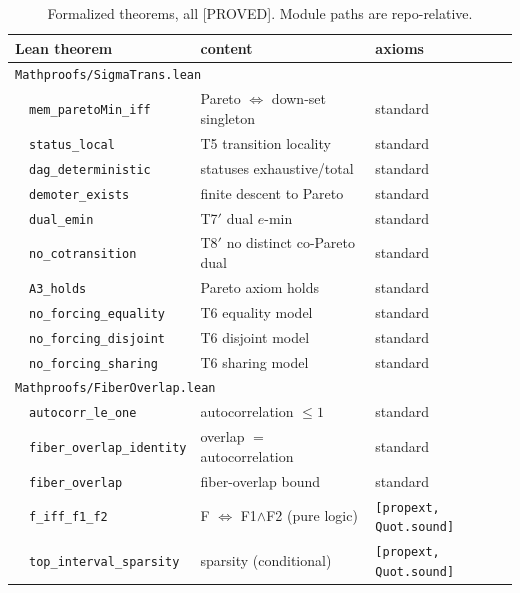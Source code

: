 \documentclass[11pt,a4paper]{article}
\theoremstyle{definition}
\begin{document}
\begin{table}[t]
  \centering
  \caption{Formalized theorems, all [PROVED]. Module paths are
    repo-relative.}
  \label{tab:formalization}
  \begin{tabular}{lll}
    \toprule
    Lean theorem & content & axioms \\
    \midrule
    \multicolumn{3}{l}{\texttt{Mathproofs/SigmaTrans.lean}} \\
    \ \ \texttt{mem\_paretoMin\_iff} & Pareto $\iff$ down-set singleton
      & standard \\
    \ \ \texttt{status\_local} & T5 transition locality & standard \\
    \ \ \texttt{dag\_deterministic} & statuses exhaustive/total & standard \\
    \ \ \texttt{demoter\_exists} & finite descent to Pareto & standard \\
    \ \ \texttt{dual\_emin} & T7$'$ dual $e$-min & standard \\
    \ \ \texttt{no\_cotransition} & T8$'$ no distinct co-Pareto dual
      & standard \\
    \ \ \texttt{A3\_holds} & Pareto axiom holds & standard \\
    \ \ \texttt{no\_forcing\_equality} & T6 equality model & standard \\
    \ \ \texttt{no\_forcing\_disjoint} & T6 disjoint model & standard \\
    \ \ \texttt{no\_forcing\_sharing} & T6 sharing model & standard \\
    \multicolumn{3}{l}{\texttt{Mathproofs/FiberOverlap.lean}} \\
    \ \ \texttt{autocorr\_le\_one} & autocorrelation $\le1$ & standard \\
    \ \ \texttt{fiber\_overlap\_identity} & overlap $=$ autocorrelation
      & standard \\
    \ \ \texttt{fiber\_overlap} & fiber-overlap bound & standard \\
    \ \ \texttt{f\_iff\_f1\_f2} & F $\iff$ F1$\land$F2 (pure logic)
      & \texttt{[propext, Quot.sound]} \\
    \ \ \texttt{top\_interval\_sparsity} & sparsity (conditional)
      & \texttt{[propext, Quot.sound]} \\
    \bottomrule
  \end{tabular}
\end{table}
\end{document}

